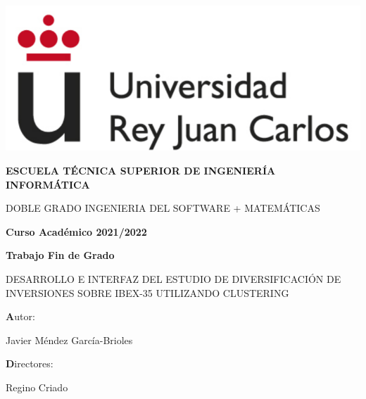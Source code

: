 \documentclass[12pt,a4paper]{article}
\begin{document}
\begin{titlepage}
	\centering
	{\includegraphics[scale=0.5]{logo}\par}
	\vspace{1cm}
	{\bfseries\large ESCUELA TÉCNICA SUPERIOR DE INGENIERÍA INFORMÁTICA \par}
	\vspace{1cm}
	{\scshape\large DOBLE GRADO INGENIERIA DEL SOFTWARE + MATEMÁTICAS\par}
	\vspace{1cm}
	{\bfseries\large Curso Académico 2021/2022 \par}
	\vspace{1cm}
	{\bfseries\large  Trabajo Fin de Grado \par}
	\vspace{2cm}
	{\scshape\large DESARROLLO E INTERFAZ DEL ESTUDIO DE DIVERSIFICACIÓN DE INVERSIONES SOBRE IBEX-35 UTILIZANDO CLUSTERING\par}
	\vspace{2cm}
	\vfill
	{\normalsize\textbf Autor: \par}
	{\normalsize Javier Méndez García-Brioles \par}
	{\normalsize\textbf Directores: \par}
	{\normalsize Regino Criado \par}
\end{titlepage}





	\vspace{1cm}
	\tableofcontents

\pagebreak
	
	\vspace{1cm}
\end{document}
